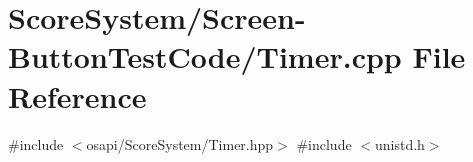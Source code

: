 \hypertarget{_screen-_button_test_code_2_timer_8cpp}{}\section{Score\+System/\+Screen-\/\+Button\+Test\+Code/\+Timer.cpp File Reference}
\label{_screen-_button_test_code_2_timer_8cpp}
{\ttfamily \#include $<$osapi/\+Score\+System/\+Timer.\+hpp$>$}\newline
{\ttfamily \#include $<$unistd.\+h$>$}\newline
